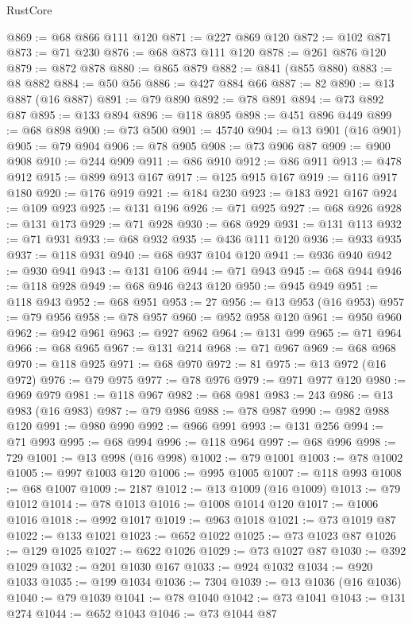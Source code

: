 \begin{lexlean}{RustCore}
\begin{coremodule}
@869 := @68 @866 @111 @120
@871 := @227 @869 @120
@872 := @102 @871
@873 := @71 @230
@876 := @68 @873 @111 @120
@878 := @261 @876 @120
@879 := @872 @878
@880 := @865 @879
@882 := @841 (@855 @880)
@883 := @8 @882
@884 := @50 @56
@886 := @427 @884 @66
@887 := 82
@890 := @13 @887 (@16 @887)
@891 := @79 @890
@892 := @78 @891
@894 := @73 @892 @87
@895 := @133 @894
@896 := @118 @895
@898 := @451 @896 @449
@899 := @68 @898
@900 := @73 @500
@901 := 45740
@904 := @13 @901 (@16 @901)
@905 := @79 @904
@906 := @78 @905
@908 := @73 @906 @87
@909 := @900 @908
@910 := @244 @909
@911 := @86 @910
@912 := @86 @911
@913 := @478 @912
@915 := @899 @913 @167
@917 := @125 @915 @167
@919 := @116 @917 @180
@920 := @176 @919
@921 := @184 @230
@923 := @183 @921 @167
@924 := @109 @923
@925 := @131 @196
@926 := @71 @925
@927 := @68 @926
@928 := @131 @173
@929 := @71 @928
@930 := @68 @929
@931 := @131 @113
@932 := @71 @931
@933 := @68 @932
@935 := @436 @111 @120
@936 := @933 @935
@937 := @118 @931
@940 := @68 @937 @104 @120
@941 := @936 @940
@942 := @930 @941
@943 := @131 @106
@944 := @71 @943
@945 := @68 @944
@946 := @118 @928
@949 := @68 @946 @243 @120
@950 := @945 @949
@951 := @118 @943
@952 := @68 @951
@953 := 27
@956 := @13 @953 (@16 @953)
@957 := @79 @956
@958 := @78 @957
@960 := @952 @958 @120
@961 := @950 @960
@962 := @942 @961
@963 := @927 @962
@964 := @131 @99
@965 := @71 @964
@966 := @68 @965
@967 := @131 @214
@968 := @71 @967
@969 := @68 @968
@970 := @118 @925
@971 := @68 @970
@972 := 81
@975 := @13 @972 (@16 @972)
@976 := @79 @975
@977 := @78 @976
@979 := @971 @977 @120
@980 := @969 @979
@981 := @118 @967
@982 := @68 @981
@983 := 243
@986 := @13 @983 (@16 @983)
@987 := @79 @986
@988 := @78 @987
@990 := @982 @988 @120
@991 := @980 @990
@992 := @966 @991
@993 := @131 @256
@994 := @71 @993
@995 := @68 @994
@996 := @118 @964
@997 := @68 @996
@998 := 729
@1001 := @13 @998 (@16 @998)
@1002 := @79 @1001
@1003 := @78 @1002
@1005 := @997 @1003 @120
@1006 := @995 @1005
@1007 := @118 @993
@1008 := @68 @1007
@1009 := 2187
@1012 := @13 @1009 (@16 @1009)
@1013 := @79 @1012
@1014 := @78 @1013
@1016 := @1008 @1014 @120
@1017 := @1006 @1016
@1018 := @992 @1017
@1019 := @963 @1018
@1021 := @73 @1019 @87
@1022 := @133 @1021
@1023 := @652 @1022
@1025 := @73 @1023 @87
@1026 := @129 @1025
@1027 := @622 @1026
@1029 := @73 @1027 @87
@1030 := @392 @1029
@1032 := @201 @1030 @167
@1033 := @924 @1032
@1034 := @920 @1033
@1035 := @199 @1034
@1036 := 7304
@1039 := @13 @1036 (@16 @1036)
@1040 := @79 @1039
@1041 := @78 @1040
@1042 := @73 @1041
@1043 := @131 @274
@1044 := @652 @1043
@1046 := @73 @1044 @87

\end{coremodule}
\end{lexlean}
